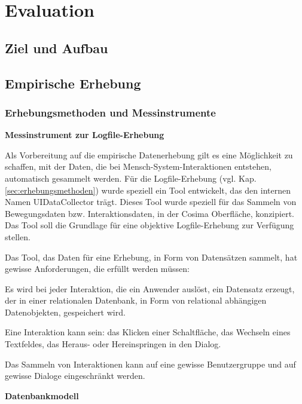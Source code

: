 \section{Evaluation}

\subsection{Ziel und Aufbau}

\subsection{Empirische Erhebung}

\subsubsection{Erhebungsmethoden und Messinstrumente}



\textbf{Messinstrument zur Logfile-Erhebung}

Als Vorbereitung auf die empirische Datenerhebung gilt es eine Möglichkeit zu schaffen, mit der Daten, die bei Mensch-System-Interaktionen entstehen, automatisch gesammelt werden. Für die Logfile-Erhebung (vgl. Kap. \ref{sec:erhebungsmethoden}) wurde speziell ein Tool entwickelt, das den internen Namen UIDataCollector trägt. Dieses Tool wurde speziell für das Sammeln von Bewegungsdaten bzw. Interaktionsdaten, in der Cosima Oberfläche, konzipiert. Das Tool soll die Grundlage für eine objektive Logfile-Erhebung zur Verfügung stellen.

Das Tool, das Daten für eine Erhebung, in Form von Datensätzen sammelt, hat gewisse Anforderungen, die erfüllt werden müssen:
\begin{compactitem}
   \item Es wird bei jeder Interaktion, die ein Anwender auslöst, ein Datensatz erzeugt, der in einer relationalen Datenbank, in Form von relational abhängigen Datenobjekten, gespeichert wird.
   \item Eine Interaktion kann sein: das Klicken einer Schaltfläche, das Wechseln eines Textfeldes, das Heraus- oder Hereinspringen in den Dialog.
   \item Das Sammeln von Interaktionen kann auf eine gewisse Benutzergruppe und auf gewisse Dialoge eingeschränkt werden.
\end{compactitem}

\textbf{Datenbankmodell}

